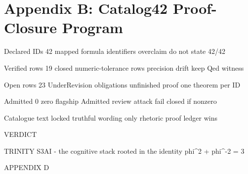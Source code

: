 
\section{Appendix B: Catalog42 Proof-Closure Program}

Declared IDs                       42                        mapped formula identifiers       overclaim                   do not state 42/42

 Verified rows                      19                        closed numeric-tolerance rows    precision drift             keep Qed witness

 Open rows                          23                        UnderRevision obligations        unfinished proof            one theorem per ID

 Admitted                           0                         zero flagship Admitted           review attack               fail closed if nonzero

 Catalogue text                     locked                    truthful wording only            rhetoric                    proof ledger wins

  VERDICT

                                  TRINITY S3AI - the cognitive stack rooted in the identity phi^2 + phi^-2 = 3

                                                             APPENDIX D
